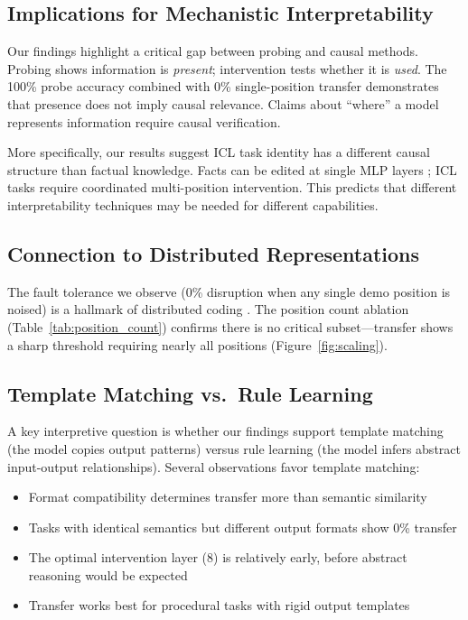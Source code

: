 \documentclass{article}
\begin{document}
\subsection{Implications for Mechanistic Interpretability}

Our findings highlight a critical gap between probing and causal methods. Probing shows information is \emph{present}; intervention tests whether it is \emph{used}. The 100\% probe accuracy combined with 0\% single-position transfer demonstrates that presence does not imply causal relevance. Claims about ``where'' a model represents information require causal verification.

More specifically, our results suggest ICL task identity has a different causal structure than factual knowledge. Facts can be edited at single MLP layers \citep{meng2022locating}; ICL tasks require coordinated multi-position intervention. This predicts that different interpretability techniques may be needed for different capabilities.

\subsection{Connection to Distributed Representations}

The fault tolerance we observe (0\% disruption when any single demo position is noised) is a hallmark of distributed coding \citep{hinton1986distributed}. The position count ablation (Table~\ref{tab:position_count}) confirms there is no critical subset---transfer shows a sharp threshold requiring nearly all positions (Figure~\ref{fig:scaling}).

\subsection{Template Matching vs.\ Rule Learning}

A key interpretive question is whether our findings support template matching (the model copies output patterns) versus rule learning (the model infers abstract input-output relationships). Several observations favor template matching:

\begin{itemize}
    \item Format compatibility determines transfer more than semantic similarity
    \item Tasks with identical semantics but different output formats show 0\% transfer
    \item The optimal intervention layer (8) is relatively early, before abstract reasoning would be expected
    \item Transfer works best for procedural tasks with rigid output templates
\end{itemize}
\end{document}
